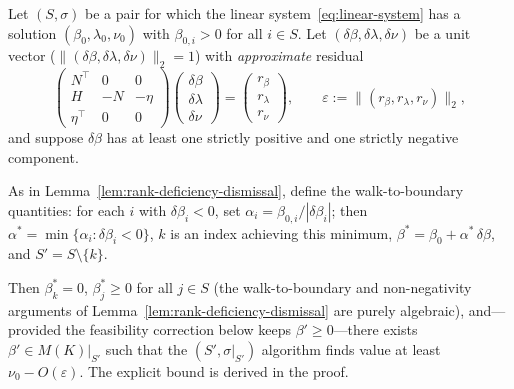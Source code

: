 \begin{proposition}%
\label{prop:approximate-dismissal}
Let $(S, \sigma)$ be a pair for which the linear
system~\eqref{eq:linear-system} has a solution
$(\beta_0, \lambda_0, \nu_0)$ with $\beta_{0,i} > 0$ for all
$i \in S$.
Let $(\delta\beta, \delta\lambda, \delta\nu)$ be a unit vector
($\|(\delta\beta, \delta\lambda, \delta\nu)\|_2 = 1$) with
\emph{approximate} residual
\[
  \begin{pmatrix}
    N^\top & 0 & 0 \\
    H & -N & -\eta \\
    \eta^\top & 0 & 0
  \end{pmatrix}
  \begin{pmatrix}\delta\beta\\\delta\lambda\\\delta\nu\end{pmatrix}
  = \begin{pmatrix}r_\beta\\r_\lambda\\r_\nu\end{pmatrix},
  \qquad
  \varepsilon
  := \bigl\|(r_\beta, r_\lambda, r_\nu)\bigr\|_2,
\]
and suppose $\delta\beta$ has at least one strictly positive and
one strictly negative component.

As in Lemma~\ref{lem:rank-deficiency-dismissal}, define the
walk-to-boundary quantities:
for each $i$ with $\delta\beta_i < 0$, set
$\alpha_i = \beta_{0,i}/|\delta\beta_i|$; then
$\alpha^* = \min\{\alpha_i : \delta\beta_i < 0\}$,
$k$ is an index achieving this minimum,
$\beta^* = \beta_0 + \alpha^*\,\delta\beta$,
and $S' = S \setminus \{k\}$.

Then $\beta^*_k = 0$, $\beta^*_j \geq 0$ for all $j \in S$
(the walk-to-boundary and non-negativity arguments of
Lemma~\ref{lem:rank-deficiency-dismissal} are purely algebraic),
and—provided the feasibility correction below keeps
$\beta' \geq 0$—there exists $\beta' \in M(K)|_{S'}$ such that
the $(S', \sigma|_{S'})$ algorithm finds value at least
$\nu_0 - O(\varepsilon)$.
The explicit bound is derived in the proof.
\end{proposition}

